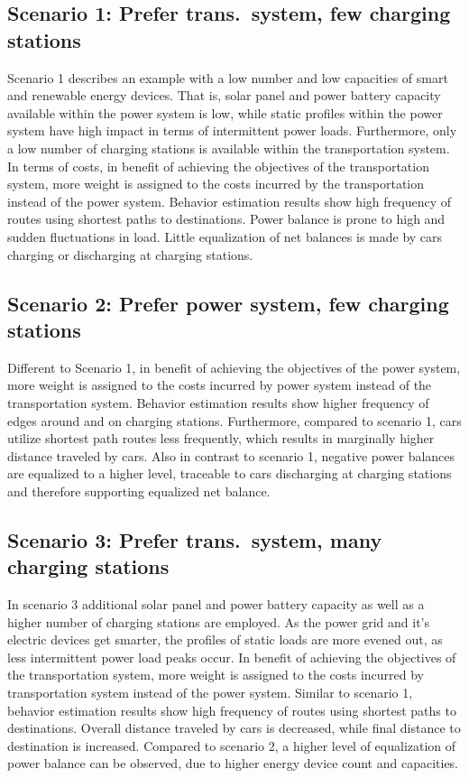 \subsection*{Scenario 1: Prefer trans.\ system, few charging stations}
Scenario 1 describes an example with a low number and low capacities of smart and renewable energy devices. That is, solar panel and power battery capacity available within the power system is low, while static profiles within the power system have high impact in terms of intermittent power loads. Furthermore, only a low number of charging stations is available within the transportation system. In terms of costs, in benefit of achieving the objectives of the transportation system, more weight is assigned to the costs incurred by the transportation instead of the power system. Behavior estimation results show high frequency of routes using shortest paths to destinations. Power balance is prone to high and sudden fluctuations in load. Little equalization of net balances is made by cars charging or discharging at charging stations.

\subsection*{Scenario 2: Prefer power system, few charging stations}

Different to Scenario 1, in benefit of achieving the objectives of the power system, more weight is assigned to the costs incurred by power system instead of the transportation system. Behavior estimation results show higher frequency of edges around and on charging stations. Furthermore, compared to scenario 1, cars utilize shortest path routes less frequently, which results in marginally higher distance traveled by cars. Also in contrast to scenario 1, negative power balances are equalized to a higher level, traceable to cars discharging at charging stations and therefore supporting equalized net balance.

\subsection*{Scenario 3: Prefer trans.\ system, many charging stations}

In scenario 3 additional solar panel and power battery capacity as well as a higher number of charging stations are employed. As the power grid and it's electric devices get smarter, the profiles of static loads are more evened out, as less intermittent power load peaks occur. In benefit of achieving the objectives of the transportation system, more weight is assigned to the costs incurred by transportation system instead of the power system. Similar to scenario 1, behavior estimation results show high frequency of routes using shortest paths to destinations. Overall distance traveled by cars is decreased, while final distance to destination is increased. Compared to scenario 2, a higher level of equalization of power balance can be observed, due to higher energy device count and capacities.

